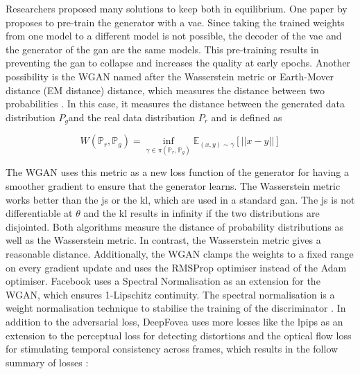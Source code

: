 \par
Researchers proposed many solutions to keep both in equilibrium. One paper by \cite{ham2020} proposes to pre-train the generator with a \gls{vae}. Since taking the trained weights from one model to a different model is not possible, the decoder of the \gls{vae} and the generator of the \gls{gan} are the same models. This pre-training results in preventing the \gls{gan} to collapse and increases the quality at early epochs. Another possibility is the WGAN named after the Wasserstein metric or Earth-Mover distance (EM distance) distance, which measures the distance between two probabilities \parencite{Vaserstein1969}. In this case, it measures the distance between the generated data distribution \(P_{g}\)and the real data distribution \(P_{r}\) and is defined as

\[W(\mathbb{P}_{r},\mathbb{P}_{g}) = \inf_{\gamma \in \pi(\mathbb{P}_{r},\mathbb{P}_{g})} \mathbb{E}_{(x,y)\sim\gamma}[||x-y||] \]

The WGAN uses this metric as a new loss function of the generator for having a smoother gradient to ensure that the generator learns. The Wasserstein metric works better than the \gls{js} or the \gls{kl}, which are used in a standard \gls{gan}. The \gls{js} is not differentiable at \(\theta\) and the \gls{kl} results in infinity if the two distributions are disjointed. Both algorithms measure the distance of probability distributions as well as the Wasserstein metric. In contrast, the Wasserstein metric gives a reasonable distance. Additionally, the WGAN clamps the weights to a fixed range on every gradient update and uses the RMSProp optimiser instead of the Adam optimiser. Facebook uses a Spectral Normalisation as an extension for the WGAN, which ensures 1-Lipschitz continuity. The spectral normalisation is a weight normalisation technique to stabilise the training of the discriminator \parencite{Miyato2018}. In addition to the adversarial loss, DeepFovea uses more losses like the \gls{lpips} as an extension to the perceptual loss
for detecting distortions and the optical flow loss for stimulating temporal consistency across frames, which results in the follow summary of losses \parencite{Kaplanyan2019}:

